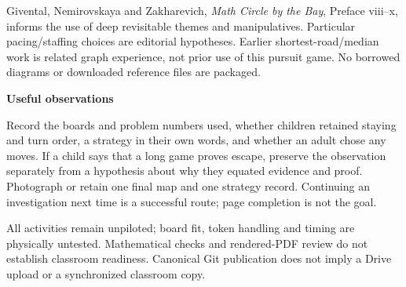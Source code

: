 \documentclass[11pt,letterpaper]{article}
\newcommand{\sub}[1]{\par\textbf{#1}\par}
\begin{document}
Givental, Nemirovskaya and Zakharevich, \emph{Math Circle by the Bay}, Preface viii--x, informs the use of deep revisitable themes and manipulatives. Particular pacing/staffing choices are editorial hypotheses. Earlier shortest-road/median work is related graph experience, not prior use of this pursuit game. No borrowed diagrams or downloaded reference files are packaged.

\sub{Useful observations}
Record the boards and problem numbers used, whether children retained staying and turn order, a strategy in their own words, and whether an adult chose any moves. If a child says that a long game proves escape, preserve the observation separately from a hypothesis about why they equated evidence and proof. Photograph or retain one final map and one strategy record. Continuing an investigation next time is a successful route; page completion is not the goal.

All activities remain unpiloted; board fit, token handling and timing are physically untested. Mathematical checks and rendered-PDF review do not establish classroom readiness. Canonical Git publication does not imply a Drive upload or a synchronized classroom copy.
\end{document}
